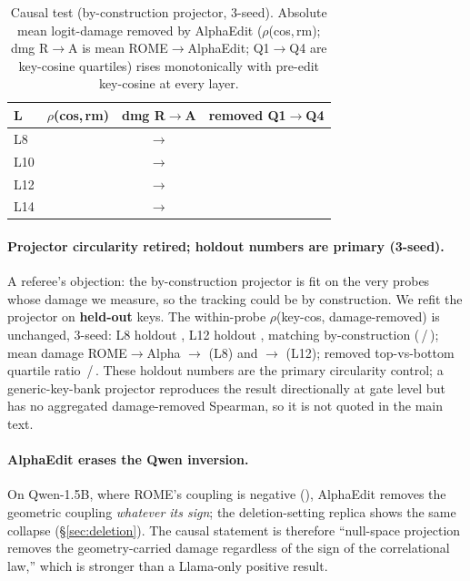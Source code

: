 \begin{table}[t]
\centering\small
\setlength{\tabcolsep}{3pt}
\begin{tabular}{@{}lccc@{}}
\toprule
L & $\rho$(cos,\,rm) & dmg R$\rightarrow$A & removed Q1$\rightarrow$Q4 \\
\midrule
L8  & \cbcRhoLeight{}    & \cbcDmgLeightRome{}$\rightarrow$\cbcDmgLeightAlpha{}       & \cbcQuartLeight{} \\
L10 & \cbcRhoLten{}      & \cbcDmgLtenRome{}$\rightarrow$\cbcDmgLtenAlpha{}           & \cbcQuartLten{} \\
L12 & \cbcRhoLtwelve{}   & \cbcDmgLtwelveRome{}$\rightarrow$\cbcDmgLtwelveAlpha{}     & \cbcQuartLtwelve{} \\
L14 & \cbcRhoLfourteen{} & \cbcDmgLfourteenRome{}$\rightarrow$\cbcDmgLfourteenAlpha{} & \cbcQuartLfourteen{} \\
\bottomrule
\end{tabular}
\caption{Causal test (by-construction projector, 3-seed). Absolute mean
logit-damage removed by AlphaEdit ($\rho$(cos,\,rm); dmg R$\rightarrow$A is mean
ROME$\rightarrow$AlphaEdit; Q1$\rightarrow$Q4 are key-cosine quartiles) rises
monotonically with pre-edit key-cosine at every layer.}
\label{tab:causal}
\end{table}

\paragraph{Projector circularity retired; holdout numbers are primary
(3-seed).} A referee's objection: the by-construction projector is fit on the
very probes whose damage we measure, so the tracking could be by construction.
We refit the projector on \textbf{held-out} keys. The within-probe
$\rho$(key-cos, damage-removed) is unchanged, 3-seed: L8 holdout \hoRhoLeight{},
L12 holdout \hoRhoLtwelve{}, matching by-construction
(\cbcRhoLeight{}\,/\,\cbcRhoLtwelve{}); mean damage ROME$\rightarrow$Alpha
\hoDmgLeightRome{}$\rightarrow$\hoDmgLeightAlpha{} (L8) and
\hoDmgLtwelveRome{}$\rightarrow$\hoDmgLtwelveAlpha{} (L12); removed
top-vs-bottom quartile ratio \hoRatioLeight{}\,/\,\hoRatioLtwelve{}. These
holdout numbers are the primary circularity control; a generic-key-bank
projector reproduces the result directionally at gate level but has no
aggregated damage-removed Spearman, so it is not quoted in the main text.

\paragraph{AlphaEdit erases the Qwen inversion.} On Qwen-1.5B, where ROME's
coupling is negative (\qwenFifteenSigned{}), AlphaEdit removes the geometric
coupling \emph{whatever its sign}; the deletion-setting replica shows the same
collapse (\S\ref{sec:deletion}). The causal statement is therefore
``null-space projection removes the geometry-carried damage regardless of the
sign of the correlational law,'' which is stronger than a Llama-only positive
result.

